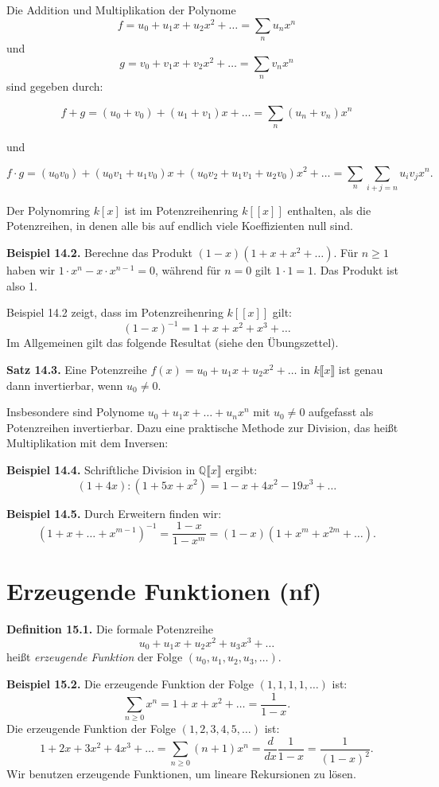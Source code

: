 \documentclass[9pt]{article}
\begin{document}
Die Addition und Multiplikation der Polynome  
\[
f = u_0 + u_1x + u_2x^2 + \dots = \sum_{n} u_n x^n
\]
und  
\[
g = v_0 + v_1x + v_2x^2 + \dots = \sum_{n} v_n x^n
\]
sind gegeben durch:

\[
f + g = (u_0 + v_0) + (u_1 + v_1)x + \dots = \sum_{n} (u_n + v_n) x^n
\]

und

\[
f \cdot g = (u_0 v_0) + (u_0 v_1 + u_1 v_0)x + (u_0 v_2 + u_1 v_1 + u_2 v_0)x^2 + \dots = \sum_{n} \sum_{i+j=n} u_i v_j x^n.
\]

Der Polynomring \( k[x] \) ist im Potenzreihenring \( k[[x]] \) enthalten, als die Potenzreihen, in denen alle bis auf endlich viele Koeffizienten null sind.


\textbf{Beispiel 14.2.} Berechne das Produkt \( (1 - x)(1 + x + x^2 + \dots) \).  
Für \( n \geq 1 \) haben wir \( 1 \cdot x^n - x \cdot x^{n-1} = 0 \), während für \( n = 0 \) gilt \( 1 \cdot 1 = 1 \). Das Produkt ist also 1.

Beispiel 14.2 zeigt, dass im Potenzreihenring \( k[[x]] \) gilt:  
\[
(1 - x)^{-1} = 1 + x + x^2 + x^3 + \dots
\]
Im Allgemeinen gilt das folgende Resultat (siehe den Übungszettel).


\textbf{Satz 14.3.} Eine Potenzreihe \( f(x) = u_0 + u_1x + u_2x^2 + \dots \) in \( k\llbracket x\rrbracket \) ist genau dann invertierbar, wenn \( u_0 \neq 0 \).

Insbesondere sind Polynome \( u_0 + u_1x + \dots + u_nx^n \) mit \( u_0 \neq 0 \) aufgefasst  
als Potenzreihen invertierbar. Dazu eine praktische Methode zur Division,  
das heißt Multiplikation mit dem Inversen:


\textbf{Beispiel 14.4.} Schriftliche Division in \( \mathbb{Q} \llbracket x\rrbracket \) ergibt:
\[
(1 + 4x) : (1 + 5x + x^2) = 1 - x + 4x^2 - 19x^3 + \dots
\]

\textbf{Beispiel 14.5.} Durch Erweitern finden wir:
\[
(1 + x + \dots + x^{m-1})^{-1} = \frac{1 - x}{1 - x^m} = (1 - x)(1 + x^m + x^{2m} + \dots).
\]


\section{Erzeugende Funktionen (nf)}
\textbf{Definition 15.1.} Die formale Potenzreihe
\[
u_0 + u_1x + u_2x^2 + u_3x^3 + \dots
\]
heißt \textit{erzeugende Funktion} der Folge \( (u_0, u_1, u_2, u_3, \dots) \).

\textbf{Beispiel 15.2.} Die erzeugende Funktion der Folge \( (1,1,1,1,\dots) \) ist:
\[
\sum_{n \geq 0} x^n = 1 + x + x^2 + \dots = \frac{1}{1 - x}.
\]
Die erzeugende Funktion der Folge \( (1,2,3,4,5,\dots) \) ist:
\[
1 + 2x + 3x^2 + 4x^3 + \dots = \sum_{n \geq 0} (n+1)x^n = \frac{d}{dx} \frac{1}{1 - x} = \frac{1}{(1 - x)^2}.
\]
Wir benutzen erzeugende Funktionen, um lineare Rekursionen zu lösen.
\end{document}
